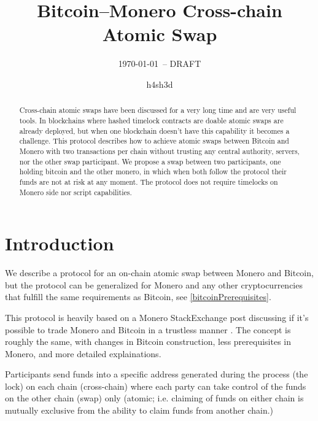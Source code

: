 \documentclass{llncs}
\begin{document}
\title{Bitcoin--Monero Cross-chain Atomic Swap}
\author{h4sh3d}

\subtitle{{\normalsize\today{\small\ -- DRAFT}}}

\maketitle

\begin{abstract}
    Cross-chain atomic swaps have been discussed for a very long time and are very useful tools. In blockchains where hashed timelock contracts are doable atomic swaps are already deployed, but when one blockchain doesn't have this capability it becomes a challenge. This protocol describes how to achieve atomic swaps between Bitcoin and Monero with two transactions per chain without trusting any central authority, servers, nor the other swap participant.
    We propose a swap between two participants, one holding bitcoin and the other monero, in which when both follow the protocol their funds are not at risk at any moment. The protocol does not require timelocks on Monero side nor script capabilities.
\end{abstract}

\section{Introduction}
We describe a protocol for an on-chain atomic swap between Monero and Bitcoin, but the protocol can be generalized for Monero and any other cryptocurrencies that fulfill the same requirements as Bitcoin, see \ref{bitcoinPrerequisites}.

This protocol is heavily based on a Monero StackExchange post discussing if it's possible to trade Monero and Bitcoin in a trustless manner \cite{MoneroStackexchangeSwap}. The concept is roughly the same, with changes in Bitcoin construction, less prerequisites in Monero, and more detailed explainations.

Participants send funds into a specific address generated during the process (the lock) on each chain (cross-chain) where each party can take control of the funds on the other chain (swap) only (atomic; i.e. claiming of funds on either chain is mutually exclusive from the ability to claim funds from another chain.)
\end{document}
